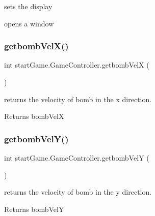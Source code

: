 sets the display 

opens a window \hypertarget{classstart_game_1_1_game_controller_a1b902c1d6b489b6499c340b1db67e868}{}\label{classstart_game_1_1_game_controller_a1b902c1d6b489b6499c340b1db67e868} 
\subsubsection{\texorpdfstring{getbomb\+Vel\+X()}{getbombVelX()}}
{\footnotesize\ttfamily int start\+Game.\+Game\+Controller.\+getbomb\+VelX (\begin{DoxyParamCaption}{ }\end{DoxyParamCaption})}



returns the velocity of bomb in the x direction. 

\begin{DoxyReturn}{Returns}
bomb\+VelX 
\end{DoxyReturn}
\hypertarget{classstart_game_1_1_game_controller_a8996d95affa45808c489767da11b6622}{}\label{classstart_game_1_1_game_controller_a8996d95affa45808c489767da11b6622} 
\subsubsection{\texorpdfstring{getbomb\+Vel\+Y()}{getbombVelY()}}
{\footnotesize\ttfamily int start\+Game.\+Game\+Controller.\+getbomb\+VelY (\begin{DoxyParamCaption}{ }\end{DoxyParamCaption})}



returns the velocity of bomb in the y direction. 

\begin{DoxyReturn}{Returns}
bomb\+VelY 
\end{DoxyReturn}
\hypertarget{classstart_game_1_1_game_controller_a8b653d5dc322ed45691f1b50dcb16b05}{}\label{classstart_game_1_1_game_controller_a8b653d5dc322ed45691f1b50dcb16b05} 
